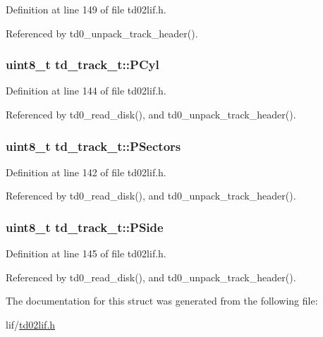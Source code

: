 Definition at line 149 of file td02lif.\+h.



Referenced by td0\+\_\+unpack\+\_\+track\+\_\+header().

\subsubsection[{\texorpdfstring{P\+Cyl}{PCyl}}]{\setlength{\rightskip}{0pt plus 5cm}uint8\+\_\+t td\+\_\+track\+\_\+t\+::\+P\+Cyl}\hypertarget{structtd__track__t_a479a4bf60fcfdcbca513ebdea33b8e8c}{}\label{structtd__track__t_a479a4bf60fcfdcbca513ebdea33b8e8c}


Definition at line 144 of file td02lif.\+h.



Referenced by td0\+\_\+read\+\_\+disk(), and td0\+\_\+unpack\+\_\+track\+\_\+header().

\subsubsection[{\texorpdfstring{P\+Sectors}{PSectors}}]{\setlength{\rightskip}{0pt plus 5cm}uint8\+\_\+t td\+\_\+track\+\_\+t\+::\+P\+Sectors}\hypertarget{structtd__track__t_a8f8ba7a0392f869f062f46d50a11bdfa}{}\label{structtd__track__t_a8f8ba7a0392f869f062f46d50a11bdfa}


Definition at line 142 of file td02lif.\+h.



Referenced by td0\+\_\+read\+\_\+disk(), and td0\+\_\+unpack\+\_\+track\+\_\+header().

\subsubsection[{\texorpdfstring{P\+Side}{PSide}}]{\setlength{\rightskip}{0pt plus 5cm}uint8\+\_\+t td\+\_\+track\+\_\+t\+::\+P\+Side}\hypertarget{structtd__track__t_af2074402835d514cbf7f5f40e25fa284}{}\label{structtd__track__t_af2074402835d514cbf7f5f40e25fa284}


Definition at line 145 of file td02lif.\+h.



Referenced by td0\+\_\+read\+\_\+disk(), and td0\+\_\+unpack\+\_\+track\+\_\+header().



The documentation for this struct was generated from the following file\+:\begin{DoxyCompactItemize}
\item 
lif/\hyperlink{td02lif_8h}{td02lif.\+h}\end{DoxyCompactItemize}

